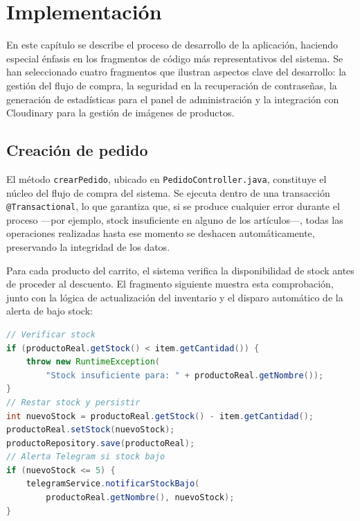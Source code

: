 \section{Implementación}

En este capítulo se describe el proceso de desarrollo de la aplicación, haciendo especial énfasis en los fragmentos de código más representativos del sistema. Se han seleccionado cuatro fragmentos que ilustran aspectos clave del desarrollo: la gestión del flujo de compra, la seguridad en la recuperación de contraseñas, la generación de estadísticas para el panel de administración y la integración con Cloudinary para la gestión de imágenes de productos.

\subsection{Creación de pedido}

El método \texttt{crearPedido}, ubicado en \texttt{PedidoController.java}, constituye el núcleo del flujo de compra del sistema. Se ejecuta dentro de una transacción \texttt{@Transactional}, lo que garantiza que, si se produce cualquier error durante el proceso —por ejemplo, stock insuficiente en alguno de los artículos—, todas las operaciones realizadas hasta ese momento se deshacen automáticamente, preservando la integridad de los datos.

Para cada producto del carrito, el sistema verifica la disponibilidad de stock antes de proceder al descuento. El fragmento siguiente muestra esta comprobación, junto con la lógica de actualización del inventario y el disparo automático de la alerta de bajo stock:

\begin{lstlisting}[language=Java, caption={Verificación de stock y notificación al administrador (PedidoController.java).}]
// Verificar stock
if (productoReal.getStock() < item.getCantidad()) {
    throw new RuntimeException(
        "Stock insuficiente para: " + productoReal.getNombre());
}
// Restar stock y persistir
int nuevoStock = productoReal.getStock() - item.getCantidad();
productoReal.setStock(nuevoStock);
productoRepository.save(productoReal);
// Alerta Telegram si stock bajo
if (nuevoStock <= 5) {
    telegramService.notificarStockBajo(
        productoReal.getNombre(), nuevoStock);
}
\end{lstlisting}

